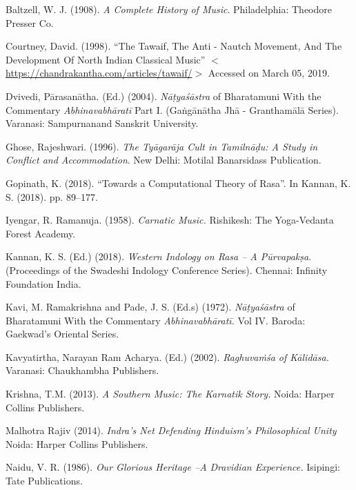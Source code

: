 \begin{thebibliography}{99}
\itemsep=0pt

  Baltzell, W. J. (1908). \textit{A Complete History of Music}. Philadelphia: Theodore Presser Co.

  Courtney, David. (1998). “The Tawaif, The Anti - Nautch Movement, And The Development Of North Indian Classical Music” $<$\url{https://chandrakantha.com/articles/tawaif/}$>$ Accessed on March 05, 2019.

  Dvivedi, Pārasanātha. (Ed.) (2004). \textit{Nāṭyaśāstra} of Bharatamuni With the Commentary \textit{Abhinavabhāratī }Part I. (Gaṅgānātha Jhā - Granthamālā Series). Varanasi: Sampurnanand Sanskrit University.

  Ghose, Rajeshwari. (1996). \textit{The Tyāgarāja Cult in Tamilnāḍu: A Study in Conflict and Accommodation}. New Delhi: Motilal Banarsidass Publication.

  Gopinath, K. (2018). “Towards a Computational Theory of Rasa”. In Kannan, K. S. (2018). pp. 89--177.

  Iyengar, R. Ramanuja. (1958). \textit{Carnatic Music.} Rishikesh: The Yoga-Vedanta Forest Academy.

  Kannan, K. S. (Ed.) (2018). \textit{Western Indology on Rasa – A Pūrvapakṣa}. (Proceedings of the Swadeshi Indology Conference Series). Chennai: Infinity Foundation India.

  Kavi, M. Ramakrishna and Pade, J. S. (Ed.s) (1972). \textit{Nāṭyaśāstra} of Bharatamuni With the Commentary \textit{Abhinavabhāratī. }Vol IV. Baroda: Gaekwad’s Oriental Series.

  Kavyatirtha, Narayan Ram Acharya. (Ed.) (2002). \textit{Raghuvaṁśa of Kālidāsa.} Varanasi: Chaukhambha Publishers.

  Krishna, T.M. (2013). \textit{A Southern Music: The Karnatik Story. }Noida: Harper Collins Publishers.

  Malhotra Rajiv (2014). \textit{Indra’s Net Defending Hinduism’s Philosophical Unity }Noida: Harper Collins Publishers.

  Naidu, V. R. (1986). \textit{Our Glorious Heritage –A Dravidian Experience. }Isipingi: Tate Publications.


\end{thebibliography}
